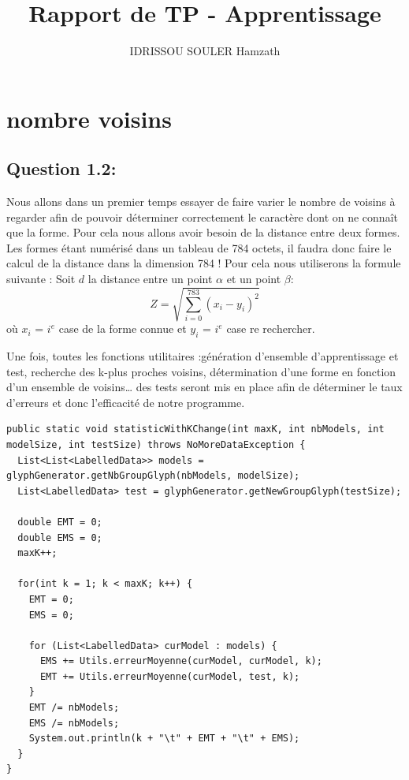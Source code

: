 \documentclass[11pt]{article}
\author{IDRISSOU SOULER Hamzath}
\title{Rapport de TP - Apprentissage }
\begin{document}
\maketitle


\section{nombre  voisins}
\subsection{Question 1.2:}
Nous allons dans un premier temps essayer de faire varier le nombre de voisins à regarder afin de pouvoir déterminer correctement le caractère dont on ne connaît que la forme.
Pour cela nous allons avoir besoin de la distance entre deux formes. Les formes étant numérisé dans un tableau de 784 octets, il faudra donc faire le calcul de la distance dans la dimension 784 ! Pour cela nous utiliserons la formule suivante :
Soit $d$ la distance entre un point $\alpha$ et un point $\beta$: \\

$$Z=\sqrt{\sum_{i=0}^{783} ({x_i - y_i})^{2}}$$
où $x_i$ = $i^{e}$ case de la forme connue et $y_i$ = $i^{e}$ case re rechercher.


Une fois, toutes les fonctions utilitaires :génération d'ensemble d'apprentissage et test, recherche des k-plus proches voisins, détermination d'une forme en fonction d'un ensemble de voisins…  des tests seront mis en place afin de déterminer le taux d'erreurs et donc l'efficacité de notre programme.

\begin{lstlisting}
public static void statisticWithKChange(int maxK, int nbModels, int modelSize, int testSize) throws NoMoreDataException {
  List<List<LabelledData>> models = glyphGenerator.getNbGroupGlyph(nbModels, modelSize);
  List<LabelledData> test = glyphGenerator.getNewGroupGlyph(testSize);
  
  double EMT = 0;
  double EMS = 0;
  maxK++;
  
  for(int k = 1; k < maxK; k++) {
    EMT = 0;
    EMS = 0;
    
    for (List<LabelledData> curModel : models) {
      EMS += Utils.erreurMoyenne(curModel, curModel, k);
      EMT += Utils.erreurMoyenne(curModel, test, k);
    }
    EMT /= nbModels;
    EMS /= nbModels;
    System.out.println(k + "\t" + EMT + "\t" + EMS);
  }
}
\end{lstlisting}
\end{document}
